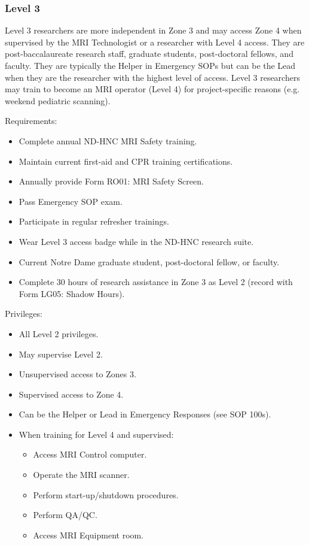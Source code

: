 \documentclass[11pt]{article}
\begin{document}
\subsubsection{Level 3}
\label{sssec:access-levels-3}

Level 3 researchers are more independent in Zone 3 and may access Zone 4 when supervised by the MRI Technologist or a researcher with Level 4 access. They are post-baccalaureate research staff, graduate students, post-doctoral fellows, and faculty. They are typically the Helper in Emergency SOPs but can be the Lead when they are the researcher with the highest level of access. Level 3 researchers may train to become an MRI operator (Level 4) for project-specific reasons (e.g. weekend pediatric scanning).

Requirements:
\begin{itemize}
	\item Complete annual ND-HNC MRI Safety training.
	\item Maintain current first-aid and CPR training certifications.
	\item Annually provide Form RO01: MRI Safety Screen.
	\item Pass Emergency SOP exam.
	\item Participate in regular refresher trainings.
	\item Wear Level 3 access badge while in the ND-HNC research suite.
	\item Current Notre Dame graduate student, post-doctoral fellow, or faculty.
	\item Complete 30 hours of research assistance in Zone 3 as Level 2 (record with Form LG05: Shadow Hours).
\end{itemize}

Privileges:
\begin{itemize}
	\item All Level 2 privileges.
	\item May supervise Level 2.
	\item Unsupervised access to Zones 3.
	\item Supervised access to Zone 4.
	\item Can be the Helper or Lead in Emergency Responses (see SOP 100s).
	\item When training for Level 4 and supervised:
	\begin{itemize}
		\item Access MRI Control computer.
		\item Operate the MRI scanner.
		\item Perform start-up/shutdown procedures.
		\item Perform QA/QC.
		\item Access MRI Equipment room.
	\end{itemize}
\end{itemize}
\end{document}
